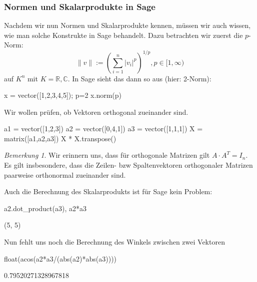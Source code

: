 \documentclass[fontsize=12pt,paper=a4,twoside,bibtotoc,idxtotoc,
liststotoc,pagesize,BCOR1.2cm,DIV15,chapterprefix,pagesize=pdftex]{scrbook}
\theoremstyle{plain}
\theoremstyle{definition}
\theoremstyle{remark}
\newtheorem{bem}[equation]{Bemerkung}
\begin{document}
\subsubsection{Normen und Skalarprodukte in Sage}
Nachdem wir nun Normen und Skalarprodukte kennen, müssen wir auch wissen, wie man solche Konstrukte in Sage behandelt. Dazu betrachten wir zuerst die $p$-Norm:
\[
\|v\|:=(\sum_{i=1}^n |v_i|^p)^{1/p}, p\in [1,\infty)                   
\]
auf $K^n$ mit $K=\mathbb{R},\mathbb{C}$. In Sage sieht das dann so aus (hier: 2-Norm):
\begin{sagein}
x = vector([1,2,3,4,5]); p=2
x.norm(p)
\end{sagein}
Wir wollen prüfen, ob Vektoren orthogonal zueinander sind.
\begin{sagein}
a1 = vector([1,2,3])
a2 = vector([0,4,1])
a3 = vector([1,1,1])
X = matrix([a1,a2,a3])
X * X.transpose() 
\end{sagein}
\begin{bem}
 Wir erinnern uns, dass für orthogonale Matrizen gilt $A\cdot A^T=I_n$. Es gilt insbesondere, dass die Zeilen- bzw Spaltenvektoren orthogonaler Matrizen paarweise 
orthonormal zueinander sind.
\end{bem}
Auch die Berechnung des Skalarprodukts ist für Sage kein Problem:
\begin{sagein}
a2.dot_product(a3), a2*a3
\end{sagein}
\begin{sage}
  (5, 5)
\end{sage}
Nun fehlt uns noch die Berechnung des Winkels zwischen zwei Vektoren
\begin{sagein}
float(acos(a2*a3/(abs(a2)*abs(a3))))
\end{sagein}
\begin{sage}
  0.79520271328967818
\end{sage}


\end{document}
